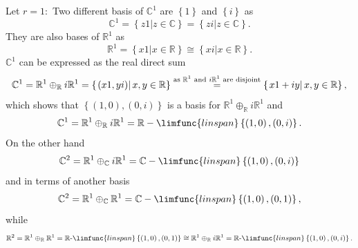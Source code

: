 \documentclass[aps,preprint]{revtex4}
\begin{document}
Let $r=1:$ Two different basis of $\mathbb{C}^{1}$ are $\left\{ 1\right\} $
and $\left\{ i\right\} $ as 
\begin{equation}
\mathbb{C}^{1}=\left\{ \left. z1\right\vert z\in \mathbb{C}\right\} =\left\{
\left. zi\right\vert z\in \mathbb{C}\right\} .
\end{equation}%
They are also bases of $\mathbb{R}^{1}$ as 
\begin{equation}
\mathbb{R}^{1}=\left\{ \left. x1\right\vert x\in \mathbb{R}\right\} \cong
\left\{ \left. xi\right\vert x\in \mathbb{R}\right\} .
\end{equation}%
$\mathbb{C}^{1}$ can be expressed as the real direct sum 
\begin{equation}
\mathbb{C}^{1}=\mathbb{R}^{1}\oplus _{\mathbb{R}}i\mathbb{R}^{1}=\left\{
\left. \left( x1,yi\right) \right\vert x,y\in \mathbb{R}\right\} \overset{%
\text{as }\mathbb{R}^{1}\text{ and }i\mathbb{R}^{1}\text{ are disjoint}}{=}%
\left\{ \left. x1+iy\right\vert x,y\in \mathbb{R}\right\} ,
\end{equation}%
which shows that $\left\{ \left( 1,0\right) ,\left( 0,i\right) \right\} $ is
a basis for $\mathbb{R}^{1}\oplus _{\mathbb{R}}i\mathbb{R}^{1}$ and 
\begin{equation}
\mathbb{C}^{1}=\mathbb{R}^{1}\oplus _{\mathbb{R}}i\mathbb{R}^{1}=\mathbb{R}-%
\limfunc{linspan}\left\{ \left( 1,0\right) ,\left( 0,i\right) \right\} .
\end{equation}%
On the other hand%
\begin{equation}
\mathbb{C}^{2}=\mathbb{R}^{1}\oplus _{\mathbb{C}}i\mathbb{R}^{1}=\mathbb{C}-%
\limfunc{linspan}\left\{ \left( 1,0\right) ,\left( 0,i\right) \right\}
\end{equation}%
and in terms of another basis 
\begin{equation}
\mathbb{C}^{2}=\mathbb{R}^{1}\oplus _{\mathbb{C}}\mathbb{R}^{1}=\mathbb{C}-%
\limfunc{linspan}\left\{ \left( 1,0\right) ,\left( 0,1\right) \right\} ,
\end{equation}%
while%
\begin{equation}
\mathbb{R}^{2}=\mathbb{R}^{1}\oplus _{\mathbb{R}}\mathbb{R}^{1}=\mathbb{R}%
\text{-}\limfunc{linspan}\left\{ \left( 1,0\right) ,\left( 0,1\right)
\right\} \cong \mathbb{R}^{1}\oplus _{\mathbb{R}}i\mathbb{R}^{1}=\mathbb{R}%
\text{-}\limfunc{linspan}\left\{ \left( 1,0\right) ,\left( 0,i\right)
\right\} .
\end{equation}
\end{document}
